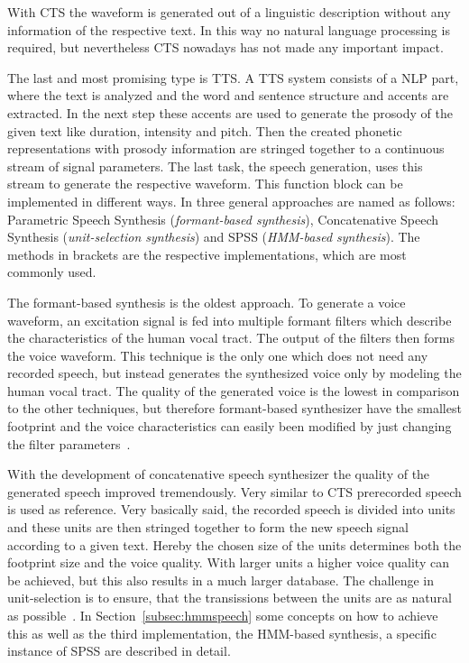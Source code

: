 With \ac{CTS} the waveform is generated out of a linguistic description without any information of the respective text. In this way no natural language processing is required, but nevertheless \ac{CTS} nowadays has not made any important impact. 

The last and most promising type is \ac{TTS}. A \ac{TTS} system consists of a \ac{NLP} part, where the text is analyzed and the word and sentence structure and accents are extracted. In the next step these accents are used to generate the prosody of the given text like duration, intensity and pitch. Then the created phonetic representations with prosody information are stringed together to a continuous stream of signal parameters. The last task, the speech generation, uses this stream to generate the respective waveform. This function block can be implemented in different ways. In \cite{hinterleitner:quality} three general approaches are named as follows: Parametric Speech Synthesis (\textit{formant-based synthesis}), Concatenative Speech Synthesis (\textit{unit-selection synthesis}) and \acf{SPSS} (\textit{\acf{HMM}-based synthesis}). The methods in brackets are the respective implementations, which are most commonly used. 

The formant-based synthesis is the oldest approach. To generate a voice waveform, an excitation signal is fed into multiple formant filters which describe the characteristics of the human vocal tract. The output of the filters then forms the voice waveform. This technique is the only one which does not need any recorded speech, but instead generates the synthesized voice only by modeling the human vocal tract. The quality of the generated voice is the lowest in comparison to the other techniques, but therefore formant-based synthesizer have the smallest footprint and the voice characteristics can easily been modified by just changing the filter parameters~\cite{hinterleitner:quality}.

With the development of concatenative speech synthesizer the quality of the generated speech improved tremendously. Very similar to \ac{CTS} prerecorded speech is used as reference. Very basically said, the recorded speech is divided into units and these units are then stringed together to form the new speech signal according to a given text. Hereby the chosen size of the units determines both the footprint size and the voice quality. With larger units a higher voice quality can be achieved, but this also results in a much larger database. The challenge in unit-selection is to ensure, that the transissions between the units are as natural as possible~\cite{hinterleitner:quality}. In Section~\ref{subsec:hmmspeech} some concepts on how to achieve this as well as the third implementation, the \ac{HMM}-based synthesis, a specific instance of \ac{SPSS} are described in detail.

